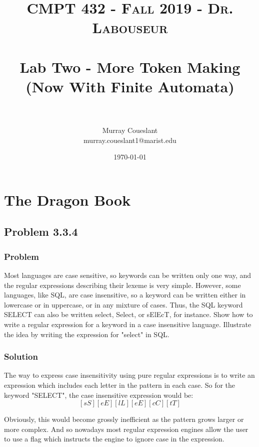 \documentclass[letterpaper, 10pt,DIV=13]{scrartcl}
\title{	
   \normalfont \normalsize 
   \textsc{CMPT 432 - Fall 2019 - Dr. Labouseur} \\[10pt] %
   \horrule{0.5pt} \\[0.25cm] 	%
   \huge Lab Two - More Token Making (Now With Finite Automata) \\     	    %
   \horrule{0.5pt} \\[0.25cm] 	%
}
\author{Murray Coueslant \\ \normalsize murray.coueslant1@marist.edu}
\date{\normalsize\today} 	%
\numberwithin{equation}{section} %
\numberwithin{figure}{section} %
\numberwithin{table}{section} %
\begin{document}
\maketitle %

\section{The Dragon Book}

\subsection{Problem 3.3.4}

\subsubsection{Problem}
Most languages are case sensitive, so keywords can be written
only one way, and the regular expressions describing their lexeme is very simple.
However, some languages, like SQL, are case insensitive, so a keyword can be
written either in lowercase or in uppercase, or in any mixture of cases. Thus,
the SQL keyword SELECT can also be written select, Select, or sElEcT, for
instance. Show how to write a regular expression for a keyword in a case insensitive language. Illustrate the idea by writing the expression for "select" in SQL.

\subsubsection{Solution}
The way to express case insensitivity using pure regular expressions is to write an expression which includes each letter in the pattern in each case. So for the keyword "SELECT", the case insensitive expression would be:
$$
[sS][eE][lL][eE][cC][tT]
$$

Obviously, this would become grossly inefficient as the pattern grows larger or more complex. And so nowadays most regular expression engines allow the user to use a flag which instructs the engine to ignore case in the expression.
\newpage
\end{document}
